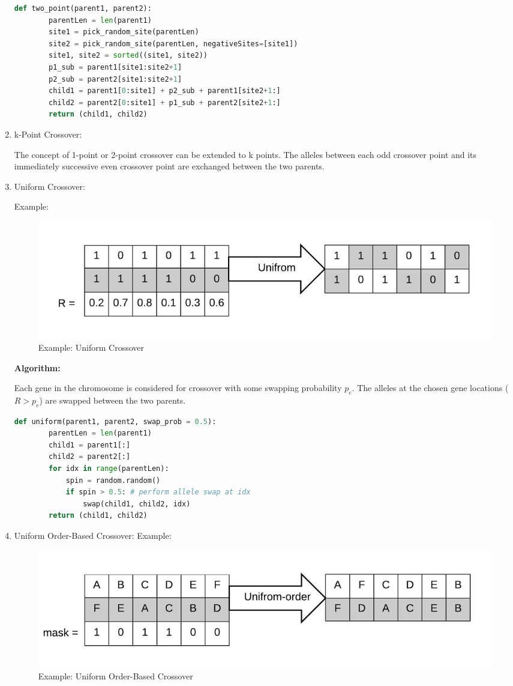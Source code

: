 \documentclass[12pt,a4paper]{article}
\begin{document}
\begin{enumerate}
	\begin{lstlisting}[language=Python]
    def two_point(parent1, parent2):
        parentLen = len(parent1)
        site1 = pick_random_site(parentLen)
        site2 = pick_random_site(parentLen, negativeSites=[site1])    
        site1, site2 = sorted((site1, site2))
        p1_sub = parent1[site1:site2+1]
        p2_sub = parent2[site1:site2+1]
        child1 = parent1[0:site1] + p2_sub + parent1[site2+1:]
        child2 = parent2[0:site1] + p1_sub + parent2[site2+1:]
        return (child1, child2)
	\end{lstlisting}

	\item k-Point Crossover: \par
	The concept of 1-point or 2-point crossover can be extended to k points. The alleles between each odd crossover point and its immediately successive even crossover point are exchanged between the two parents.
	
	\item Uniform Crossover: \par
	Example:
	\begin{figure}[h]
		\includegraphics[width=\textwidth]{xover-uniform}
		\caption{Example: Uniform Crossover}
		\centering
	\end{figure}
	
	\textbf{Algorithm:} \par
	Each gene in the chromosome is considered for crossover with some swapping probability $p_{e}$. The alleles at the chosen gene locations ($R > p_{e}$) are swapped between the two parents.
	
	\begin{lstlisting}[language=Python]
    def uniform(parent1, parent2, swap_prob = 0.5):
        parentLen = len(parent1)
        child1 = parent1[:]
        child2 = parent2[:]
        for idx in range(parentLen):
            spin = random.random()
            if spin > 0.5: # perform allele swap at idx
                swap(child1, child2, idx)
        return (child1, child2)
	\end{lstlisting}

	\item Uniform Order-Based Crossover:
	Example:
	\begin{figure}[h]
		\includegraphics[width=\textwidth]{xover-uniformorder}
		\caption{Example: Uniform Order-Based Crossover}
		\centering
	\end{figure}
	

\end{enumerate}
\end{document}
